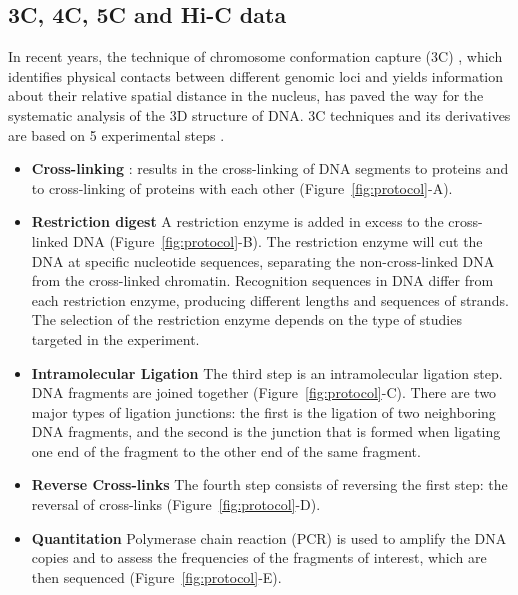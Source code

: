 \subsection{3C, 4C, 5C and Hi-C data}

In recent years, the technique of chromosome conformation capture (3C)
\citep{dekker:capturing}, which identifies physical contacts between different
genomic loci and yields information about their relative spatial distance in
the nucleus, has paved the way for the systematic analysis of the 3D structure
of DNA. 3C techniques and its derivatives are based on 5 experimental steps
\citep{lieberman-aiden:comprehensive, kalhor:genome}.

\begin{itemize}
\item \textbf{Cross-linking} : results in the cross-linking of DNA segments to
proteins and to cross-linking of proteins with each other
(Figure~\ref{fig:protocol}-A).
\item \textbf{Restriction digest} A restriction enzyme is added in excess to
the cross-linked DNA (Figure~\ref{fig:protocol}-B). The restriction enzyme
will cut the DNA at specific
nucleotide sequences, separating the non-cross-linked DNA from the
cross-linked chromatin. Recognition sequences in DNA differ from each
restriction enzyme, producing different lengths and sequences of strands.
The selection of the restriction enzyme depends on the type of studies
targeted in the experiment.
\item \textbf{Intramolecular Ligation} The third step is an intramolecular
ligation step. DNA fragments are joined together 
(Figure~\ref{fig:protocol}-C). There are two major types
of ligation junctions: the first is the ligation of two neighboring DNA
fragments, and the second is the junction that is formed when ligating one end
of the fragment to the other end of the same fragment.
\item \textbf{Reverse Cross-links} The fourth step consists of reversing the
first step: the reversal of cross-links (Figure~\ref{fig:protocol}-D).
\item \textbf{Quantitation} Polymerase chain reaction (PCR) is used to amplify
the DNA copies and to assess the frequencies of the fragments of interest,
which are then sequenced (Figure~\ref{fig:protocol}-E).
\end{itemize}

